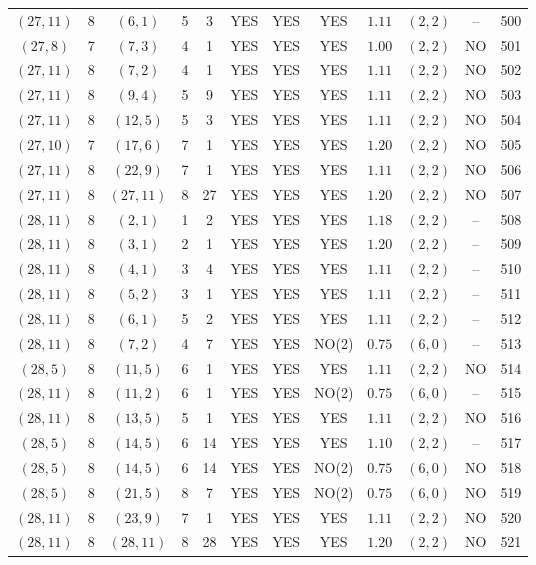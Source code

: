 \begin{longtable}{|c|c|c|c|c|c|c|c|c|c|c|c|}
$(27,11)$ & 8 & $(6,1)$ & 5 & 3 & YES & YES & YES & $1.11$ & $(2,2)$ & -- & 500\\
$(27,8)$ & 7 & $(7,3)$ & 4 & 1 & YES & YES & YES & $1.00$ & $(2,2)$ & NO & 501\\
$(27,11)$ & 8 & $(7,2)$ & 4 & 1 & YES & YES & YES & $1.11$ & $(2,2)$ & NO & 502\\
$(27,11)$ & 8 & $(9,4)$ & 5 & 9 & YES & YES & YES & $1.11$ & $(2,2)$ & NO & 503\\
$(27,11)$ & 8 & $(12,5)$ & 5 & 3 & YES & YES & YES & $1.11$ & $(2,2)$ & NO & 504\\
$(27,10)$ & 7 & $(17,6)$ & 7 & 1 & YES & YES & YES & $1.20$ & $(2,2)$ & NO & 505\\
$(27,11)$ & 8 & $(22,9)$ & 7 & 1 & YES & YES & YES & $1.11$ & $(2,2)$ & NO & 506\\
$(27,11)$ & 8 & $(27,11)$ & 8 & 27 & YES & YES & YES & $1.20$ & $(2,2)$ & NO & 507\\
$(28,11)$ & 8 & $(2,1)$ & 1 & 2 & YES & YES & YES & $1.18$ & $(2,2)$ & -- & 508\\
$(28,11)$ & 8 & $(3,1)$ & 2 & 1 & YES & YES & YES & $1.20$ & $(2,2)$ & -- & 509\\
$(28,11)$ & 8 & $(4,1)$ & 3 & 4 & YES & YES & YES & $1.11$ & $(2,2)$ & -- & 510\\
$(28,11)$ & 8 & $(5,2)$ & 3 & 1 & YES & YES & YES & $1.11$ & $(2,2)$ & -- & 511\\
$(28,11)$ & 8 & $(6,1)$ & 5 & 2 & YES & YES & YES & $1.11$ & $(2,2)$ & -- & 512\\
$(28,11)$ & 8 & $(7,2)$ & 4 & 7 & YES & YES & NO(2) & $0.75$ & $(6,0)$ & -- & 513\\
$(28,5)$ & 8 & $(11,5)$ & 6 & 1 & YES & YES & YES & $1.11$ & $(2,2)$ & NO & 514\\
$(28,11)$ & 8 & $(11,2)$ & 6 & 1 & YES & YES & NO(2) & $0.75$ & $(6,0)$ & -- & 515\\
$(28,11)$ & 8 & $(13,5)$ & 5 & 1 & YES & YES & YES & $1.11$ & $(2,2)$ & NO & 516\\
$(28,5)$ & 8 & $(14,5)$ & 6 & 14 & YES & YES & YES & $1.10$ & $(2,2)$ & -- & 517\\
$(28,5)$ & 8 & $(14,5)$ & 6 & 14 & YES & YES & NO(2) & $0.75$ & $(6,0)$ & NO & 518\\
$(28,5)$ & 8 & $(21,5)$ & 8 & 7 & YES & YES & NO(2) & $0.75$ & $(6,0)$ & NO & 519\\
$(28,11)$ & 8 & $(23,9)$ & 7 & 1 & YES & YES & YES & $1.11$ & $(2,2)$ & NO & 520\\
$(28,11)$ & 8 & $(28,11)$ & 8 & 28 & YES & YES & YES & $1.20$ & $(2,2)$ & NO & 521\\

\end{longtable}
